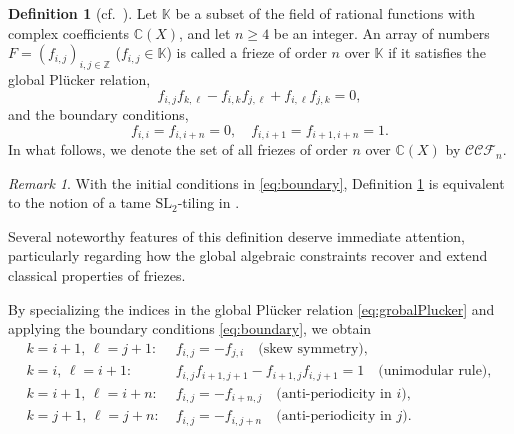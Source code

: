 \documentclass[11pt]{amsart}
\theoremstyle{plain}
\theoremstyle{definition}
\newtheorem{definition}[proposition]{Definition}
\theoremstyle{remark}
\newtheorem{remark}[proposition]{Remark}
\begin{document}
\begin{definition}[cf.~\protect\cite{Short2023}] \label{def.tame}
Let $\mathbb{K}$ be a subset of the field of rational functions with complex
coefficients $\mathbb{C}(X)$, and let $n \ge 4$ be an integer.
An array of numbers $F = (f_{i,j})_{i,j \in \mathbb{Z}}$ ($f_{i, j}\in \mathbb{K}$) is called a frieze of order
$n$ over $\mathbb{K}$ if it satisfies the global Plücker relation,
\begin{equation} \label{eq:grobalPlucker}
f_{i,j}f_{k,\ell} - f_{i,k}f_{j,\ell} + f_{i,\ell}f_{j,k} = 0,
\end{equation}
and the boundary conditions,
\begin{equation} \label{eq:boundary}
f_{i,i} = f_{i,i+n} = 0, \quad f_{i,i+1} = f_{i+1,i+n} = 1.
\end{equation}
In what follows, we denote the set of all friezes of order $n$ over
$\mathbb{C}(X)$ by $\mathcal{CCF}_n$.
\end{definition}

\begin{remark}
With the initial conditions in \eqref{eq:boundary}, Definition
\ref{def.tame} is equivalent to the notion of a tame $\mathrm{SL}_2$-tiling
in \cite{Short2023}.
\end{remark}

Several noteworthy features of this definition deserve immediate attention,
particularly regarding how the global algebraic constraints recover and extend
classical properties of friezes.

By specializing the indices in the global Plücker relation
\eqref{eq:grobalPlucker} and applying the boundary conditions
\eqref{eq:boundary}, we obtain
\begin{align}
k = i+1, \, \ell = j+1 :\; &
f_{i,j} = -f_{j,i} \quad \text{(skew symmetry)}, \label{eq.skewSym}\\
k = i, \, \ell = i+1 :\; &
f_{i,j}f_{i+1,j+1} - f_{i+1,j}f_{i,j+1} = 1 \quad \text{(unimodular rule)}, \label{eq.unimodular} \\
k = i+1, \, \ell = i+n :\; &
f_{i,j} = -f_{i+n, j} \quad \text{(anti-periodicity in $i$)}, \label{eq.antiPeriodI} \\
k = j+1, \, \ell = j+n :\; &
f_{i,j} = -f_{i, j+n} \quad \text{(anti-periodicity in $j$)} . \label{eq.antiPeriodJ}
\end{align}
\end{document}

